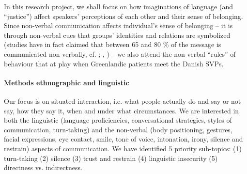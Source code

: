 \documentclass[twocolumn, issue, rga, authordate]{jote-new-article}
\begin{document}
In this research project, we shall focus on how imaginations of language
(and ``justice'') affect speakers' perceptions of each other and their sense of belonging. Since non-verbal communication affects individual's sense of belonging -- it is through non-verbal cues that groups'
identities and relations are symbolized (studies have in fact claimed that between 65 and 80 \% of the message is communicated non-verbally, cf.  \citeyear{Hall1959}; , \citeyear{ting-toomey2011}) -- we also attend the non-verbal
``rules'' of behaviour that at play when Greenlandic patients meet the Danish SVPs.


\paragraph{Methods ethnographic and linguistic}


Our focus is on situated interaction, i.e. what people actually do and say or not say, how they say it, when and under what circumstances. We are interested in both the linguistic (language proficiencies, conversational strategies, styles of communication, turn-taking) and the non-verbal (body positioning, gestures, facial expressions, eye contact, smile, tone of voice, intonation, irony, silence and restrain) aspects of communication. We have identified 5 priority sub-topics: (1) turn-taking (2) silence (3) trust and restrain
(4) linguistic insecurity (5) directness vs. indirectness.
\end{document}
